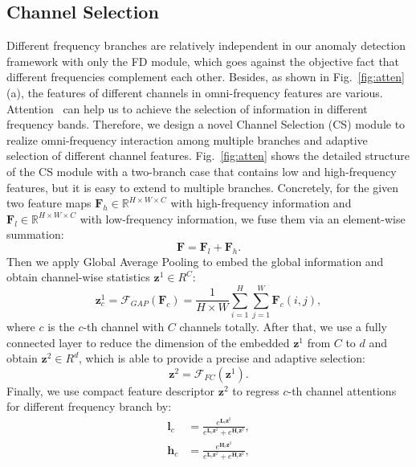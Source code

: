 \documentclass[lettersize,journal]{IEEEtran}
\begin{document}
\subsection{Channel Selection}
Different frequency branches are relatively independent in our anomaly detection framework with only the FD module, which goes against the objective fact that different frequencies complement each other. Besides, as shown in Fig.~\ref{fig:atten} (a), the features of different channels in omni-frequency features are various. Attention~\cite{li2019selective} can help us to achieve the selection of information in different frequency bands. Therefore, we design a novel Channel Selection (CS) module to realize omni-frequency interaction among multiple branches and adaptive selection of different channel features. Fig.~\ref{fig:atten} shows the detailed structure of the CS module with a two-branch case that contains low and high-frequency features, but it is easy to extend to multiple branches. Concretely, for the given two feature maps $\bm{F}_h \in \mathbb{R}^{H\times W\times C}$ with high-frequency information and $\bm{F}_l \in \mathbb{R}^{H\times W\times C}$ with low-frequency information, we fuse them via an element-wise summation:
\begin{equation}
    \bm{F} = \bm{F}_l + \bm{F}_h.
\end{equation}
Then we apply Global Average Pooling to embed the global information and obtain channel-wise statistics $\bm{z}^1 \in {R}^{C}$:
\begin{equation}
    \bm{z}^1_c = \mathcal{F}_{GAP}(\bm{F}_c) = \frac{1}{H \times W}\sum^H_{i=1}\sum^W_{j=1}\bm{F}_c(i, j),
\end{equation}
where $c$ is the $c$-th channel with $C$ channels totally. After that, we use a fully connected layer to reduce the dimension of the embedded $\bm{z}^1$ from $C$ to $d$ and obtain $\bm{z}^2 \in {R}^{d}$, which is able to provide a precise and adaptive selection:
\begin{equation}
    \bm{z}^2 = \mathcal{F}_{FC}(\bm{z}^1).
\end{equation}
Finally, we use compact feature descriptor $\bm{z}^2$ to regress $c$-th channel attentions for different frequency branch by:
\begin{equation}
\begin{aligned}
    \bm{l}_c &= \frac{e^{\bm{L}_{c} \bm{z}^2}}{e^{\bm{L}_c \bm{z}^2}+e^{\bm{H}_c \bm{z}^2}},\\
    \bm{h}_c &= \frac{e^{\bm{H}_{c} \bm{z}^2}}{e^{\bm{L}_c \bm{z}^2}+e^{\bm{H}_c \bm{z}^2}},
\end{aligned}
\label{eqa:1}
\end{equation}
\end{document}
